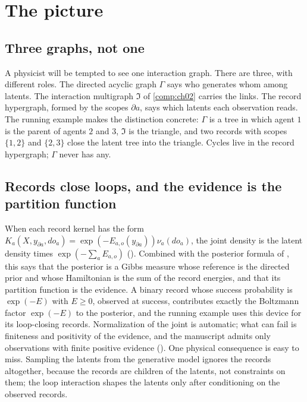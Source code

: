 \section{The picture}
\label{comp:ch04-picture}

\subsection{Three graphs, not one}

A physicist will be tempted to see one interaction graph. There are three, with different roles. The directed
acyclic graph $\Gamma$ says who generates whom among latents. The interaction multigraph $\mathfrak I$ of
\cref{comp:ch02} carries the links. The record hypergraph, formed by the scopes $\partial a$, says which latents
each observation reads. The running example makes the distinction concrete: $\Gamma$ is a tree in which agent $1$
is the parent of agents $2$ and $3$, $\mathfrak I$ is the triangle, and two records with scopes $\{1,2\}$ and
$\{2,3\}$ close the latent tree into the triangle. Cycles live in the record hypergraph; $\Gamma$ never has any.

\subsection{Records close loops, and the evidence is the partition function}

When each record kernel has the form $K_a(X,y_{\partial a},do_a)=\exp(-E_{a,o}(y_{\partial a}))\nu_a(do_a)$, the
joint density is the latent density times $\exp(-\sum_aE_{a,o})$ (). Combined with
the posterior formula of , this says that the posterior is a Gibbs
measure whose reference is the directed prior and whose Hamiltonian is the sum of the record energies, and that
its partition function is the evidence. A binary record whose success probability is $\exp(-E)$ with $E\geq0$,
observed at success, contributes exactly the Boltzmann factor $\exp(-E)$ to the posterior, and the running example
uses this device for its loop-closing records. Normalization of the joint is automatic; what can fail is
finiteness and positivity of the evidence, and the manuscript admits only observations with finite positive
evidence (). One physical consequence is easy to miss. Sampling the latents from the
generative model ignores the records altogether, because the records are children of the latents, not
constraints on them; the loop interaction shapes the latents only after conditioning on the observed records.

